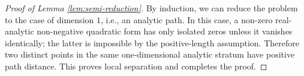 \documentclass[10pt,a4paper]{amsart}
\begin{document}
\begin{proof}[Proof of Lemma \ref{lem:semi-reduction}]
By induction, we can reduce 
the problem to the case of dimension $1$, i.e., an analytic path.
In this case,
a non-zero real-analytic
non-negative quadratic form has only isolated zeros unless it vanishes
identically; the latter is impossible by the positive-length assumption.
Therefore two distinct points in the same one-dimensional analytic stratum have
positive path distance. This
proves local separation and completes the proof.
\end{proof}
\end{document}
